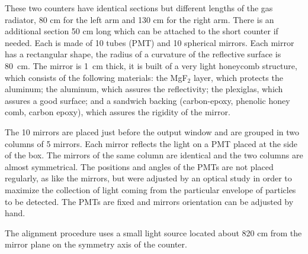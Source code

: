 These two counters have identical sections but different lengths of 
the gas radiator, 80 cm for the left arm and 130 cm for the right arm. 
There is an additional section 50 cm long which can be attached to 
the short counter if needed.
Each \Cherenkov{} is made of 10  tubes (PMT) and 10 spherical mirrors. 
Each mirror has a rectangular shape, the radius of a curvature of the reflective
surface is 80~cm. %
The mirror is 1~cm thick, it is built of a very light honeycomb structure, which
consists of the following materials:  
the MgF$_2$ layer, which protects 
the aluminum; the aluminum, which assures the reflectivity; 
the plexiglas, which assures a good surface; and  
a sandwich backing (carbon-epoxy, phenolic honey comb, carbon epoxy), 
which assures the rigidity of the mirror. 

The 10 mirrors are placed just before the output window and are grouped in 
two columns of 5 mirrors. 
Each mirror reflects the light on a PMT placed at the side of the box. 
The mirrors of the same column are identical and the two columns are 
almost symmetrical. 
The positions and angles of the PMTs are not placed regularly, as like the mirrors, 
but were adjusted by an optical study in order to maximize the collection of light 
coming from the particular envelope of particles to be detected.
The PMTs are fixed and mirrors orientation can be adjusted by hand. 

The alignment procedure uses a small light source located about 820 cm
from the mirror plane on the symmetry axis of the counter.


